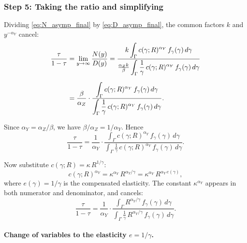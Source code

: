 \documentclass[12pt,a4paper]{article}
\theoremstyle{definition}
\theoremstyle{plain}
\theoremstyle{remark}
\begin{document}
\subsubsection{Step 5: Taking the ratio and simplifying}

Dividing \eqref{eq:N_asymp_final} by \eqref{eq:D_asymp_final}, the common factors $k$ and $y^{-\alpha_Y}$ cancel:
\begin{align}
  \frac{\tau}{1-\tau} &= \lim_{y \to \infty}\frac{N(y)}{D(y)} = \frac{k\displaystyle\int_{\Gamma} c(\gamma;R)^{\alpha_Y}\,f_{\gamma}(\gamma)\,d\gamma}
  {\frac{\alpha_Z k}{\beta}\displaystyle\int_{\Gamma} \frac{1}{\gamma}\,c(\gamma;R)^{\alpha_Y}\,f_{\gamma}(\gamma)\,d\gamma} \notag \\[6pt]
  &= \frac{\beta}{\alpha_Z}\cdot\frac{\displaystyle\int_{\Gamma} c(\gamma;R)^{\alpha_Y}\,f_{\gamma}(\gamma)\,d\gamma}
  {\displaystyle\int_{\Gamma} \frac{1}{\gamma}\,c(\gamma;R)^{\alpha_Y}\,f_{\gamma}(\gamma)\,d\gamma}. \label{eq:ratio_step1}
\end{align}

Since $\alpha_Y = \alpha_Z/\beta$, we have $\beta/\alpha_Z = 1/\alpha_Y$.  Hence
\begin{equation}
\label{eq:ratio_step2}
  \frac{\tau}{1-\tau} = \frac{1}{\alpha_Y}\cdot\frac{\displaystyle\int_{\Gamma} c(\gamma;R)^{\alpha_Y}\,f_{\gamma}(\gamma)\,d\gamma}
  {\displaystyle\int_{\Gamma} \frac{1}{\gamma}\,c(\gamma;R)^{\alpha_Y}\,f_{\gamma}(\gamma)\,d\gamma}.
\end{equation}

Now substitute $c(\gamma;R) = \kappa\,R^{1/\gamma}$:
\begin{equation}
\label{eq:c_power}
  c(\gamma;R)^{\alpha_Y} = \kappa^{\alpha_Y}\,R^{\alpha_Y/\gamma} = \kappa^{\alpha_Y}\,R^{\alpha_Y\,e(\gamma)},
\end{equation}
where $e(\gamma) = 1/\gamma$ is the compensated elasticity.  The constant $\kappa^{\alpha_Y}$ appears in both numerator and denominator, and cancels:
\begin{equation}
\label{eq:ratio_step3}
  \frac{\tau}{1-\tau} = \frac{1}{\alpha_Y}\cdot\frac{\displaystyle\int_{\Gamma} R^{\alpha_Y/\gamma}\,f_{\gamma}(\gamma)\,d\gamma}
  {\displaystyle\int_{\Gamma} \frac{1}{\gamma}\,R^{\alpha_Y/\gamma}\,f_{\gamma}(\gamma)\,d\gamma}.
\end{equation}

\paragraph{Change of variables to the elasticity $e = 1/\gamma$.}
\end{document}
